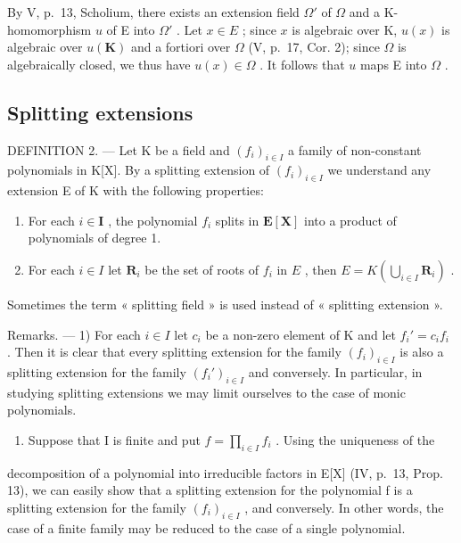 By V, p.~13, Scholium, there exists an extension field \(\Omega'\) of \(\Omega\) and a K-homomorphism \(u\) of E into \(\Omega'\) . Let \(x \in E\) ; since \(x\) is algebraic over K, \(u(x)\) is algebraic over \(u(\mathbf{K})\) and a fortiori over \(\Omega\) (V, p.~17, Cor. 2); since \(\Omega\) is algebraically closed, we thus have \(u(x) \in \Omega\) . It follows that \(u\) maps E into \(\Omega\) .

\subsection{Splitting extensions}

DEFINITION 2. --- Let K be a field and \((f_{i})_{i\in I}\) a family of non-constant polynomials in K{[}X{]}. By a splitting extension of \((f_{i})_{i\in I}\) we understand any extension E of K with the following properties:

\begin{enumerate}
\def\labelenumi{\alph{enumi})}
\item
  For each \(i \in \mathbf{I}\) , the polynomial \(f_i\) splits in \(\mathbf{E}[\mathbf{X}]\) into a product of polynomials of degree 1.
\item
  For each \(i \in I\) let \(\mathbf{R}_i\) be the set of roots of \(f_i\) in \(E\) , then \(E = K\left(\bigcup_{i \in I} \mathbf{R}_i\right)\) .
\end{enumerate}

Sometimes the term « splitting field » is used instead of « splitting extension ».

Remarks. --- 1) For each \(i \in I\) let \(c_i\) be a non-zero element of K and let \(f_i' = c_i f_i\) . Then it is clear that every splitting extension for the family \((f_i)_{i \in I}\) is also a splitting extension for the family \((f_i')_{i \in I}\) and conversely. In particular, in studying splitting extensions we may limit ourselves to the case of monic polynomials.

\begin{enumerate}
\def\labelenumi{\arabic{enumi})}
\setcounter{enumi}{1}
\tightlist
\item
  Suppose that I is finite and put \(f = \prod_{i \in I} f_i\) . Using the uniqueness of the
\end{enumerate}

decomposition of a polynomial into irreducible factors in E{[}X{]} (IV, p.~13, Prop. 13), we can easily show that a splitting extension for the polynomial f is a splitting extension for the family \((f_{i})_{i \in I}\) , and conversely. In other words, the case of a finite family may be reduced to the case of a single polynomial.

